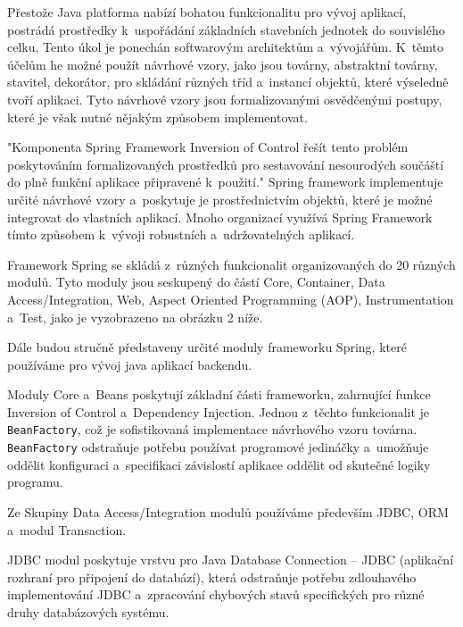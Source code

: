 \documentclass[12pt]{article}
\begin{document}

Přestože Java platforma nabízí bohatou funkcionalitu pro vývoj aplikací,
postrádá prostředky k~uspořádání základních stavebních jednotek do souvislého celku,
Tento úkol je ponechán softwarovým architektům a~vývojářům.
K~těmto účelům he možné použít návrhové vzory, jako jsou továrny, abstraktní továrny,
stavitel, dekorátor, pro skládání různých tříd a~instancí objektů,
které výseledně tvoří aplikaci.
Tyto návrhové vzory jsou formalizovanými osvědčenými postupy,
které je však nutné nějakým způsobem implementovat.

"Komponenta Spring Framework Inversion of Control řešít tento problém
poskytováním formalizovaných prostředků pro sestavování nesourodých
součáští do plně funkční aplikace připravené k~použití."
Spring framework  implementuje určité návrhové vzory a~poskytuje
je prostřednictvím objektů, které je možné integrovat do vlastních aplikací.
Mnoho organizací využívá Spring Framework tímto způsobem k~vývoji robustních
a~udržovatelných aplikací.

Framework Spring se skládá z~různých funkcionalit organizovaných do 20 různých modulů.
Tyto moduly jsou seskupený do částí Core, Container, Data Access/Integration,
Web, Aspect Oriented Programming (AOP), Instrumentation a~Test,
jako je vyzobrazeno na obrázku 2 níže.

\obrazek
{}

Dále budou stručně představeny určité moduly frameworku Spring,
které používáme pro vývoj java aplikací backendu.

Moduly Core a~Beans poskytují základní části frameworku,
zahrnující funkce Inversion of Control a~Dependency Injection.
Jednou z~těchto funkcionalit je \texttt{BeanFactory},
což je sofistikovaná implementace návrhového vzoru továrna.
\texttt{BeanFactory} odstraňuje potřebu používat programové jedináčky a~umožňuje oddělit konfiguraci a~specifikaci závislostí aplikace oddělit 
od skutečné logiky programu.

%
Ze Skupiny Data Access/Integration modulů používáme především JDBC, ORM
a~modul Transaction.

JDBC modul poskytuje vrstvu pro Java Database Connection
-- JDBC (aplikační rozhraní pro připojení do databází), 
která odstraňuje potřebu zdlouhavého implementování JDBC a~zpracování chybových stavů specifických pro různé druhy databázových systému.
\end{document}
